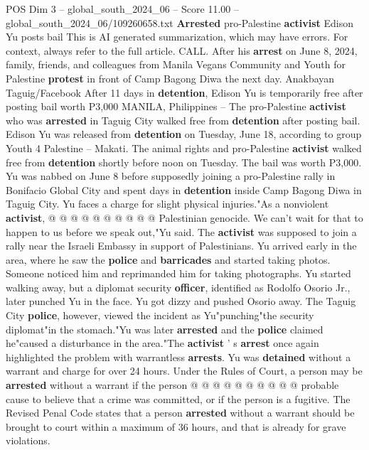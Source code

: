 \begin{textsample}{POS Dim 3 – global\_south\_2024\_06 – Score 11.00 – global\_south\_2024\_06/109260658.txt}  \label{ex:f3_pos_340}
\textbf{Arrested} pro-Palestine \textbf{activist} Edison Yu posts bail This is AI generated summarization, which may have errors.
For context, always refer to the full article.
CALL.
After his \textbf{arrest} on June 8, 2024, family, friends, and colleagues from Manila Vegans Community and Youth for Palestine \textbf{protest} in front of Camp Bagong Diwa the next day.
Anakbayan Taguig/Facebook After 11 days in \textbf{detention}, Edison Yu is temporarily free after posting bail worth P3,000 MANILA, Philippines -- The pro-Palestine \textbf{activist} who was \textbf{arrested} in Taguig City walked free from \textbf{detention} after posting bail.
Edison Yu was released from \textbf{detention} on Tuesday, June 18, according to group Youth 4 Palestine -- Makati.
The animal rights and pro-Palestine \textbf{activist} walked free from \textbf{detention} shortly before noon on Tuesday.
The bail was worth P3,000.
Yu was nabbed on June 8 before supposedly joining a pro-Palestine rally in Bonifacio Global City and spent days in \textbf{detention} inside Camp Bagong Diwa in Taguig City.
Yu faces a charge for slight physical injuries."As a nonviolent \textbf{activist}, @ @ @ @ @ @ @ @ @ @ Palestinian genocide.
We can't wait for that to happen to us before we speak out,"Yu said.
The \textbf{activist} was supposed to join a rally near the Israeli Embassy in support of Palestinians.
Yu arrived early in the area, where he saw the \textbf{police} and \textbf{barricades} and started taking photos.
Someone noticed him and reprimanded him for taking photographs.
Yu started walking away, but a diplomat security \textbf{officer}, identified as Rodolfo Osorio Jr., later punched Yu in the face.
Yu got dizzy and pushed Osorio away.
The Taguig City \textbf{police}, however, viewed the incident as Yu"punching"the security diplomat"in the stomach."Yu was later \textbf{arrested} and the \textbf{police} claimed he"caused a disturbance in the area."The \textbf{activist} ' s \textbf{arrest} once again highlighted the problem with warrantless \textbf{arrests}.
Yu was \textbf{detained} without a warrant and charge for over 24 hours.
Under the Rules of Court, a person may be \textbf{arrested} without a warrant if the person @ @ @ @ @ @ @ @ @ @ probable cause to believe that a crime was committed, or if the person is a fugitive.
The Revised Penal Code states that a person \textbf{arrested} without a warrant should be brought to court within a maximum of 36 hours, and that is already for grave violations.

\end{textsample}
